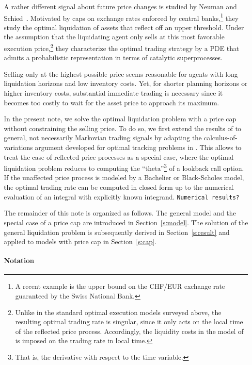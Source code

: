 \documentclass[11pt]{article}
\theoremstyle{definition}
\theoremstyle{remark}
\begin{document}
A rather different signal about future price changes is studied by Neuman and Schied~\cite{neumann.schied.??}. Motivated by caps on exchange rates enforced by central banks,\footnote{A recent example is the upper bound on the CHF/EUR exchange rate guaranteed by the Swiss National Bank.} they study the optimal liquidation of assets that reflect off an upper threshold.  Under the assumption that the liquidating agent only sells at this most favorable execution price,\footnote{Unlike in the standard optimal execution models surveyed above, the resulting optimal trading rate is singular, since it only acts on the local time of the reflected price process. Accordingly, the liquidity costs in the model of \cite{neumann.schied.??} is imposed on the trading rate in local time.} they characterize the optimal trading strategy by a PDE that admits a probabilistic representation in terms of catalytic superprocesses. 

Selling only at the highest possible price seems reasonable for agents with long liquidation horizons and low inventory costs. Yet, for shorter planning horizons or higher inventory costs, substantial immediate trading is necessary since it becomes too costly to wait for the asset price to approach its maximum.

In the present note, we solve the optimal liquidation problem with a price cap without constraining the selling price. To do so, we first extend the results of \cite{lehalle2017incorporating} to general, not necessarily Markovian trading signals by adapting the calculus-of-variations argument developed for optimal tracking problems in \cite{bank.al.17,bouchard2017equilibrium}. This allows to treat the case of reflected price processes as a special case, where the optimal liquidation problem reduces to computing the ``theta''\footnote{That is, the derivative with respect to the time variable.} of a lookback call option. If the unaffected price process is modeled by a Bachelier or Black-Scholes model, the optimal trading rate can be computed in closed form up to the numerical evaluation of an integral with explicitly known integrand. {\color{red}\texttt{Numerical results?}}

The remainder of this note is organized as follows. The general model and the special case of a price cap are introduced in Section~\ref{s:model}. The solution of the general liquidation problem is subsequently derived in Section~\ref{s:result} and applied to models with price cap in Section~\ref{s:cap}.

\paragraph{Notation}
\end{document}
